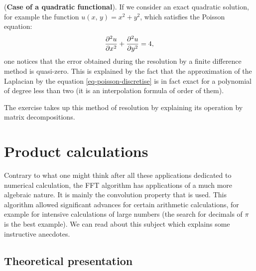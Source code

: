  
\begin{rem}{(\upshape \textbf{Case of a quadratic functional}).} 
 If we consider an exact quadratic solution, for example the function $ u (x, \, y) = x^2 + y^2 $, which satisfies the Poisson equation:
\begin{equation*}
\frac{ \partial^2 u}{\partial x^2} + \frac{ \partial^2 u}{\partial y^2} = 4,
\end{equation*}
one notices that the error obtained during the resolution by a finite difference method is quasi-zero. This is explained by the fact that the approximation of the Laplacian by the equation \eqref{eq-poisson-discretise} is in fact exact for a polynomial of degree less than two (it is an interpolation formula of order of them).
\end{rem}
The exercise  takes up this method of resolution by explaining its operation by matrix decompositions.

\section{Product calculations}
\label{sect1-calculations-products} 
 
 
 Contrary to what one might think after all these applications dedicated to numerical calculation, the FFT algorithm has applications of a much more algebraic nature. It is mainly the convolution property that is used. This algorithm allowed significant advances for certain arithmetic calculations, for example for intensive calculations of large numbers (the search for decimals of $ \pi $ is the best example). We can read about this subject \cite{bailey-pi} which explains some instructive anecdotes.
\subsection{Theoretical presentation}
\label{sect2-presentation-theoretical} 
 

